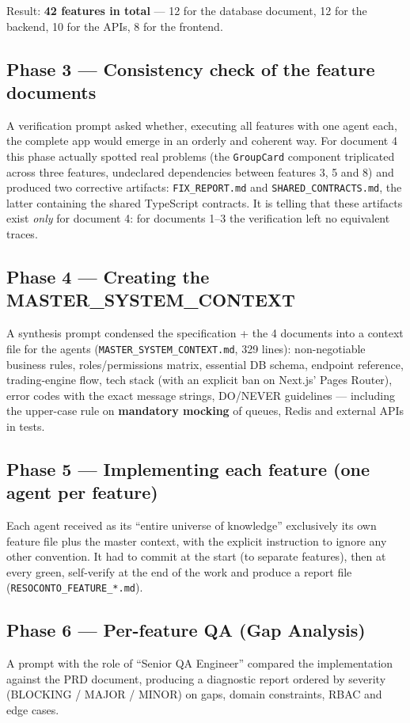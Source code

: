 \documentclass[11pt,a4paper]{article}
\newcommand{\file}[1]{\texttt{\small #1}}
\begin{document}
Result: \textbf{42 features in total} --- 12 for the database document, 12 for the backend, 10 for the APIs, 8 for the frontend.

\subsection{Phase 3 --- Consistency check of the feature documents}
A verification prompt asked whether, executing all features with one agent each, the complete app would emerge in an orderly and coherent way. For document 4 this phase actually spotted real problems (the \file{GroupCard} component triplicated across three features, undeclared dependencies between features 3, 5 and 8) and produced two corrective artifacts: \file{FIX\_REPORT.md} and \file{SHARED\_CONTRACTS.md}, the latter containing the shared TypeScript contracts. It is telling that these artifacts exist \emph{only} for document 4: for documents 1--3 the verification left no equivalent traces.

\subsection{Phase 4 --- Creating the MASTER\_SYSTEM\_CONTEXT}
A synthesis prompt condensed the specification + the 4 documents into a context file for the agents (\file{MASTER\_SYSTEM\_CONTEXT.md}, 329 lines): non-negotiable business rules, roles/permissions matrix, essential DB schema, endpoint reference, trading-engine flow, tech stack (with an explicit ban on Next.js' Pages Router), error codes with the exact message strings, DO/NEVER guidelines --- including the upper-case rule on \textbf{mandatory mocking} of queues, Redis and external APIs in tests.

\subsection{Phase 5 --- Implementing each feature (one agent per feature)}
Each agent received as its ``entire universe of knowledge'' exclusively its own feature file plus the master context, with the explicit instruction to ignore any other convention. It had to commit at the start (to separate features), then at every green, self-verify at the end of the work and produce a report file (\file{RESOCONTO\_FEATURE\_*.md}).

\subsection{Phase 6 --- Per-feature QA (Gap Analysis)}
A prompt with the role of ``Senior QA Engineer'' compared the implementation against the PRD document, producing a diagnostic report ordered by severity (BLOCKING / MAJOR / MINOR) on gaps, domain constraints, RBAC and edge cases.
\end{document}
